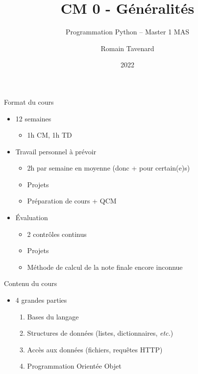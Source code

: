 \documentclass[10pt]{beamer}
\title[M1 MAS -- Python -- Généralités]{CM 0 - Généralités}
\subtitle{Programmation Python -- Master 1 MAS}
\author{Romain Tavenard}
\date{2022}
\institute{%
\hypersetup{urlcolor=.}
\makebox[2.2ex][c]{\faEnvelope}\enspace\href{mailto:romain.tavenard@univ-rennes2.fr}{\texttt{romain.tavenard@univ-rennes2.fr}}\\%
}
\begin{document}
\maketitle

\begin{frame}{Format du cours}  
  \begin{itemize}
    \item 12 semaines
    \begin{itemize}
      \item 1h CM, 1h TD
    \end{itemize}
    \item Travail personnel à prévoir
    \begin{itemize}
      \item 2h par semaine en moyenne (donc + pour certain(e)s)
      \item Projets
      \item Préparation de cours + QCM
    \end{itemize}
    \item Évaluation
    \begin{itemize}
      \item 2 contrôles continus
      \item Projets
      \item Méthode de calcul de la note finale encore inconnue
    \end{itemize}
  \end{itemize}
\end{frame}

\begin{frame}{Contenu du cours}  
  \begin{itemize}
    \item 4 grandes parties
    \begin{enumerate}
      \item Bases du langage
      \item Structures de données (listes, dictionnaires, \emph{etc.})
      \item Accès aux données (fichiers, requêtes HTTP)
      \item Programmation Orientée Objet
    \end{enumerate}
  \end{itemize}
\end{frame}
\end{document}
